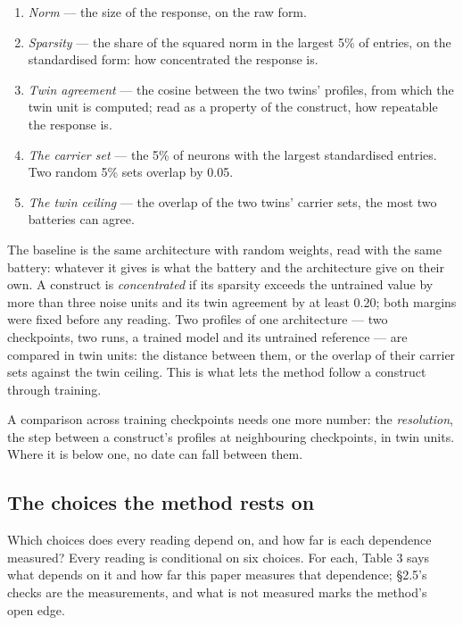 \documentclass{article}
\begin{document}
\begin{enumerate}[topsep=2pt,itemsep=1pt,parsep=0pt,partopsep=0pt,leftmargin=*]
\item \emph{Norm} --- the size of the response, on the raw form.
\item \emph{Sparsity} --- the share of the squared norm in the largest 5\% of entries, on the standardised form: how concentrated the response is.
\item \emph{Twin agreement} --- the cosine between the two twins' profiles, from which the twin unit is computed; read as a property of the construct, how repeatable the response is.
\item \emph{The carrier set} --- the 5\% of neurons with the largest standardised entries. Two random 5\% sets overlap by 0.05.
\item \emph{The twin ceiling} --- the overlap of the two twins' carrier sets, the most two batteries can agree.
\end{enumerate}

The baseline is the same architecture with random weights, read with the same battery: whatever it gives is what the battery and the architecture give on their own. A construct is \emph{concentrated} if its sparsity exceeds the untrained value by more than three noise units and its twin agreement by at least 0.20; both margins were fixed before any reading. Two profiles of one architecture --- two checkpoints, two runs, a trained model and its untrained reference --- are compared in twin units: the distance between them, or the overlap of their carrier sets against the twin ceiling. This is what lets the method follow a construct through training.

A comparison across training checkpoints needs one more number: the \emph{resolution}, the step between a construct's profiles at neighbouring checkpoints, in twin units. Where it is below one, no date can fall between them.

\subsection{The choices the method rests on}

Which choices does every reading depend on, and how far is each dependence measured? Every reading is conditional on six choices. For each, Table 3 says what depends on it and how far this paper measures that dependence; \S2.5's checks are the measurements, and what is not measured marks the method's open edge.
\end{document}
